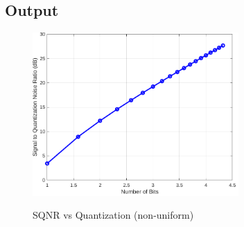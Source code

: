 \inputminted[fontsize=\footnotesize,autogobble]{matlab}{code/sqnr2.m}
\subsection{Output}

\begin{figure}[!htb]
    \centering
    \includegraphics[width=0.7\textwidth]{res/figures/Figure_4.pdf}
    \label{output:SQNR vs quantization 2}
    \caption{SQNR vs Quantization (non-uniform)}
\end{figure}